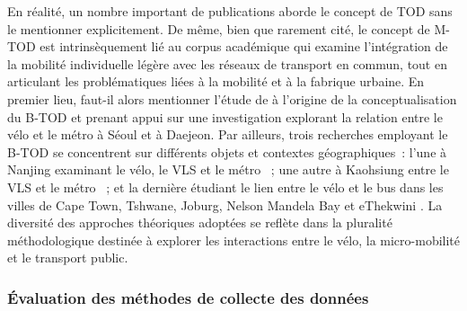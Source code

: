 \begin{refsegment}
En réalité, un nombre important de publications aborde le concept de \acrshort{TOD} sans le mentionner explicitement. De même, bien que rarement cité, le concept de \acrshort{M-TOD} est intrinsèquement lié au corpus académique qui examine l'intégration de la mobilité individuelle légère avec les réseaux de transport en commun, tout en articulant les problématiques liées à la mobilité et à la fabrique urbaine. En premier lieu, faut-il alors mentionner l'étude de \textcolor{blue}{\textcite{lee_bicycle-based_2016}} à l'origine de la conceptualisation du \acrshort{B-TOD} et prenant appui sur une investigation explorant la relation entre le vélo et le métro à Séoul et à Daejeon. Par ailleurs, trois recherches employant le \acrshort{B-TOD} se concentrent sur différents objets et contextes géographiques~: l'une à Nanjing examinant le vélo, le \acrshort{VLS} et le métro \textcolor{blue}{\autocite{ji_public_2017}}~; une autre à Kaohsiung entre le \acrshort{VLS} et le métro \textcolor{blue}{\autocite{cheng_expanding_2018}}~; et la dernière étudiant le lien entre le vélo et le bus dans les villes de Cape Town, Tshwane, Joburg, Nelson Mandela Bay et eThekwini \textcolor{blue}{\autocite{cooke_relationship_2018}}. La diversité des approches théoriques adoptées se reflète dans la pluralité méthodologique destinée à explorer les interactions entre le vélo, la micro-mobilité et le transport public.%

\subsubsection*{Évaluation des méthodes de collecte des données
    \label{chap2:methodes-collecte-donnees}
    }
    

\end{refsegment}
